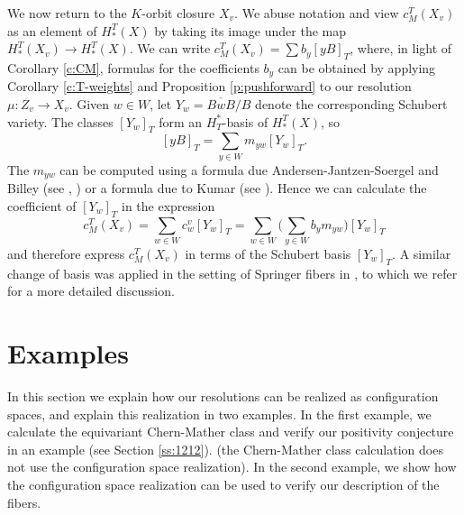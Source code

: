 \documentclass[11pt,letterpaper,reqno]{amsart}
\numberwithin{equation}{section}
\theoremstyle{plain}
\theoremstyle{definition}
\theoremstyle{remark}
\begin{document}
We now return to the $K$-orbit closure $X_v$.  We abuse
notation and view $c_M^T(X_v)$ as an element of $H^T_*(X)$
by taking its image under the map $H^T_*(X_v) \to H^T_*(X)$.
We can write $c_M^T(X_v) = \sum b_y [yB]_T$, where, in light
of Corollary \ref{c:CM}, formulas for the coefficients $b_y$ can
be obtained by
applying Corollary \ref{c:T-weights} and Proposition \ref{p:pushforward} to our resolution $\mu: Z_v \to X_v$.  
Given $w \in W$, let
$Y_w = \overline{BwB}/B$ denote the corresponding Schubert
variety.  The classes $[Y_w]_T$ form an $H^*_T$-basis
of $H^T_*(X)$, so
\[
[yB]_T = \sum_{y \in W} m_{yw} [Y_w]_T.
\] 
The $m_{yw}$ can be computed
using a formula due Andersen-Jantzen-Soergel and Billey (see \cite{AJS94}, \cite{Billey99})  or a formula due
to Kumar (see \cite{Kumar1996}). 
Hence we can calculate the coefficient of $[Y_w]_T$ in the expression
\begin{equation} \label{e:CM-Schubert}
c_M^T(X_v) = \sum_{w \in W} c^v_w [Y_w]_T = \sum_{w \in W} \Big( \sum_{y \in W} b_y m_{yw} \Big) [Y_w]_T
\end{equation}
and therefore express $c_M^T(X_v)$ in terms of the Schubert basis $[Y_w]_T$.
A similar change of basis was applied in the setting of Springer fibers in  \cite[Section 4]{GZ}, to which we refer
for a more detailed discussion.






\section{Examples} \label{s:examples}
In this section we explain how our resolutions can be realized
as configuration spaces, and explain this realization in two examples.
In the first example, we calculate the equivariant Chern-Mather
class and verify our positivity conjecture in an example (see Section \ref{ss:1212}).  
(the Chern-Mather class calculation does not use the configuration space realization).
In the second example, we show how the configuration space realization can be used
to verify our description of the fibers.
\end{document}
